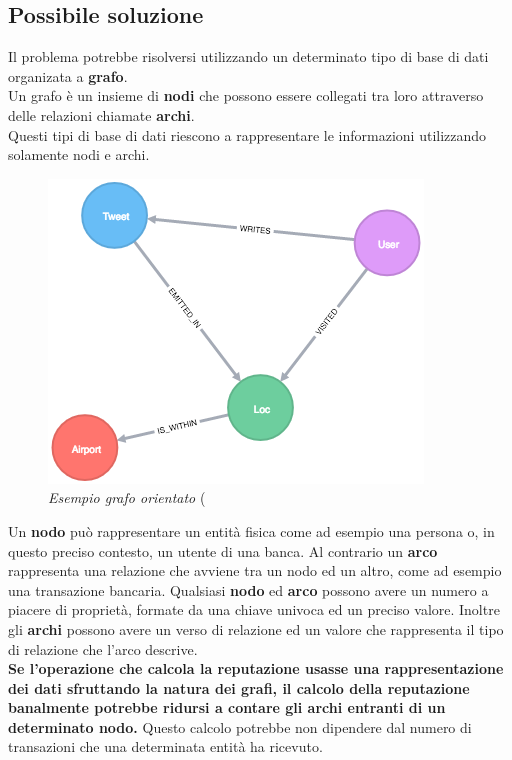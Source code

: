 \subsection{Possibile soluzione}
Il problema potrebbe risolversi utilizzando un determinato tipo di base di dati organizata a \textbf{grafo}.\\
Un grafo è un insieme di \textbf{nodi} che possono essere collegati tra loro attraverso delle relazioni chiamate \textbf{archi}.\\
Questi tipi di base di dati riescono a rappresentare le informazioni utilizzando solamente nodi e archi.
\newpage
\begin{figure}[h!]
	\centering
	\includegraphics[scale=0.7]{immagini/grafo.png}
	\caption{\textit{Esempio grafo orientato} (}
\end{figure}
Un \textbf{nodo} può rappresentare un entità fisica come ad esempio una persona o, in questo preciso contesto, un utente di una banca. Al contrario un \textbf{arco} rappresenta una relazione che avviene tra un nodo ed un altro, come ad esempio una transazione bancaria. Qualsiasi \textbf{nodo} ed \textbf{arco} possono avere un numero a piacere di proprietà, formate da una chiave univoca ed un preciso valore. Inoltre gli \textbf{archi} possono avere un verso di relazione ed un valore che rappresenta il tipo di relazione che l'arco descrive.\\
\textbf{Se l'operazione che calcola la reputazione usasse una rappresentazione dei dati sfruttando la natura dei grafi, il calcolo della reputazione banalmente potrebbe ridursi a contare gli archi entranti di un determinato nodo.} Questo calcolo potrebbe non dipendere dal numero di transazioni che una determinata entità ha ricevuto.\\
